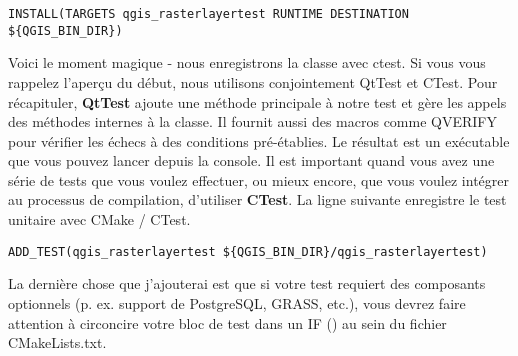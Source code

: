 \begin{verbatim}
INSTALL(TARGETS qgis_rasterlayertest RUNTIME DESTINATION ${QGIS_BIN_DIR})
\end{verbatim}

Voici le moment magique - nous enregistrons la classe avec ctest. Si vous vous rappelez l'aperçu du début, nous utilisons conjointement QtTest et CTest. Pour récapituler, \textbf{QtTest} ajoute une méthode principale à notre test et gère les appels des méthodes internes à la classe. Il fournit aussi des macros comme QVERIFY pour vérifier les échecs à des conditions pré-établies. Le résultat est un exécutable que vous pouvez lancer depuis la console. Il est important quand vous avez une série de tests que vous voulez effectuer, ou mieux encore, que vous voulez intégrer au processus de compilation, d'utiliser \textbf{CTest}. La ligne suivante enregistre le test unitaire avec CMake / CTest.

\begin{verbatim}
ADD_TEST(qgis_rasterlayertest ${QGIS_BIN_DIR}/qgis_rasterlayertest)
\end{verbatim}

La dernière chose que j'ajouterai est que si votre test requiert des composants optionnels (p. ex. support de PostgreSQL, GRASS, etc.), vous devrez faire attention à circoncire votre bloc de test dans un IF () au sein du fichier CMakeLists.txt.

